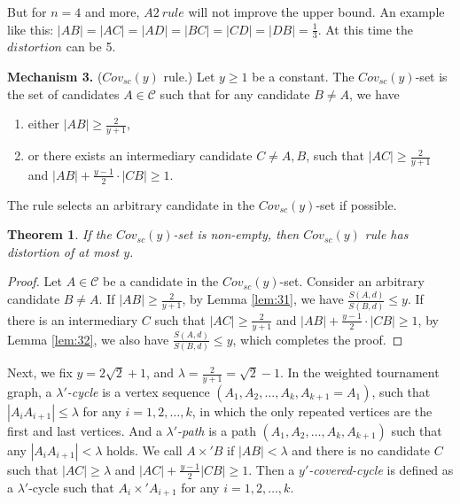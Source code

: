 \documentclass[11pt]{article}
\newtheorem{theorem}{Theorem}[section]
\theoremstyle{remark}
\begin{document}
But for $n=4$ and more, $A2\ rule$ will not improve the upper bound. An example like this: $|AB|=|AC|=|AD|=|BC|=|CD|=|DB|=\frac{1}{3}$. At this time the $distortion$ can be 5.

\fi

\vspace{2mm}\hspace{-4mm}\textbf{Mechanism 3.} {\sc($Cov_{sc}(y)$ rule.)} Let $y\ge 1$ be a constant.   The $Cov_{sc}(y)$-set is the set of candidates $A\in \mathcal C$ such that for any candidate $B\neq A$, we have
\begin{enumerate}
\item either $|AB| \ge \frac{2}{y+1}$,
\item or there exists an intermediary candidate $C\neq A,B$, such that $|AC|\ge \frac{2}{y+1}$ and $|AB|+\frac{y-1}{2}\cdot |CB|\ge 1$.
\end{enumerate}
The rule selects an arbitrary candidate in the $Cov_{sc}(y)$-set if possible.


\begin{theorem}\label{thm:Cov_{sc}}
 If the $Cov_{sc}(y)$-set is non-empty, then $Cov_{sc}(y)$ rule has distortion of at most $y$.
\end{theorem}
\begin{proof}
 Let $A\in \mathcal C$ be a candidate in the $Cov_{sc}(y)$-set. Consider an arbitrary candidate $B\neq A$. If $|AB|\ge \frac{2}{y+1}$, by Lemma \ref{lem:31}, we have $\frac{S(A,d)}{S(B,d)}\le y$. If there is an intermediary $C$ such that $|AC|\ge \frac{2}{y+1}$ and $|AB|+\frac{y-1}{2}\cdot |CB|\ge 1$, by Lemma \ref{lem:32}, we also have $\frac{S(A,d)}{S(B,d)}\le y$, which completes the proof.
\end{proof}




Next, we fix $y=2\sqrt2+1$, and $\lambda=\frac{2}{y+1} = \sqrt2-1$.  In the weighted tournament graph, a \emph{$\lambda'$-cycle} is a vertex sequence $(A_1,A_2,\ldots,A_k,A_{k+1}=A_1)$, such that $|A_iA_{i+1}|\le \lambda$ for any $i=1,2,\ldots,k$,  in which the only repeated vertices are the first and last vertices. And a \emph{$\lambda'$-path} is a path $(A_1,A_2,\ldots,A_k,A_{k+1})$ such that any $|A_iA_{i+1}|<\lambda$ holds.
  We call $A\times' B$ if $|AB|<\lambda$ and there is no candidate $C$ such that $|AC|\ge \lambda$ and $|AC|+\frac{y-1}{2}|CB|\ge 1$. Then a \emph{$y'$-covered-cycle} is defined as a $\lambda'$-cycle such that $A_i\times' A_{i+1}$ for any $i=1,2,\ldots,k$.

\end{document}
